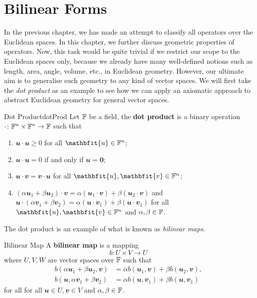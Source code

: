 \documentclass[math, code]{amznotes}
\theoremstyle{remark}
\newcommand{\zero}{\mathbf{0}}
\begin{document}
\section{Bilinear Forms}
In the previous chapter, we has made an attempt to classify all operators over the Euclidean spaces. In this chapter, we further discuss geometric properties of operators. Now, this task would be quite trivial if we restrict our scope to the Euclidean spaces only, because we already have many well-defined notions such as length, area, angle, volume, etc., in Euclidean geometry. However, our ultimate aim is to generalise such geometry to any kind of vector spaces. We will first take the \textit{dot product} as an example to see how we can apply an axiomatic approach to abstract Euclidean geometry for general vector spaces.
\begin{dfnbox}{Dot Product}{dotProd}
    Let $\mathbb{F}$ be a field, the {\color{red} \textbf{dot product}} is a binary operation $\cdot \colon \mathbb{F}^n \times \mathbb{F}^n \to \mathbb{F}$ such that 
    \begin{enumerate}
        \item $\mathbfit{u} \cdot \mathbfit{u} \geq 0$ for all $\mathbfit{u} \in \F^n$;
        \item $\mathbfit{u} \cdot \mathbfit{u} = 0$ if and only if $\mathbfit{u} = \zero$;
        \item $\mathbfit{u} \cdot \mathbfit{v} = \mathbfit{v} \cdot \mathbfit{u}$ for all $\mathbfit{u}, \mathbfit{v} \in \F^n$;
        \item $(\alpha\mathbfit{u}_1 + \beta\mathbfit{u}_2) \cdot \mathbfit{v} = \alpha(\mathbfit{u}_1 \cdot \mathbfit{v}) + \beta(\mathbfit{u}_2 \cdot \mathbfit{v})$ and $\mathbfit{u} \cdot (\alpha\mathbfit{v}_1 + \beta\mathbfit{v}_2) = \alpha(\mathbfit{u} \cdot \mathbfit{v}_1) + \beta(\mathbfit{u} \cdot \mathbfit{v}_1)$ for all $\mathbfit{u}, \mathbfit{v} \in \F^n$ and $\alpha, \beta \in \mathbb{F}$.
    \end{enumerate}
\end{dfnbox}
The dot product is an example of what is known as \textit{bilinear maps}. 
\begin{dfnbox}{Bilinear Map}
    A {\color{red} \textbf{bilinear map}} is a mapping
    \begin{equation*}
        b \colon U \times V \to U
    \end{equation*}   
    where $U, V, W$ are vector spaces over $\mathbb{F}$ such that
    \begin{align*}
        b(\alpha\mathbfit{u}_1 + \beta\mathbfit{u}_2, \mathbfit{v}) & = \alpha b(\mathbfit{u}_1, \mathbfit{v}) + \beta b(\mathbfit{u}_2, \mathbfit{v}), \\
        b(\mathbfit{u}, \alpha\mathbfit{v}_1 + \beta\mathbfit{v}_2) & = \alpha b(\mathbfit{u}, \mathbfit{v}_1) + \beta b(\mathbfit{u}, \mathbfit{v}_1)
    \end{align*}
    for all for all $\mathbfit{u} \in U, \mathbfit{v} \in V$ and $\alpha, \beta \in \mathbb{F}$.
\end{dfnbox}
\end{document}
